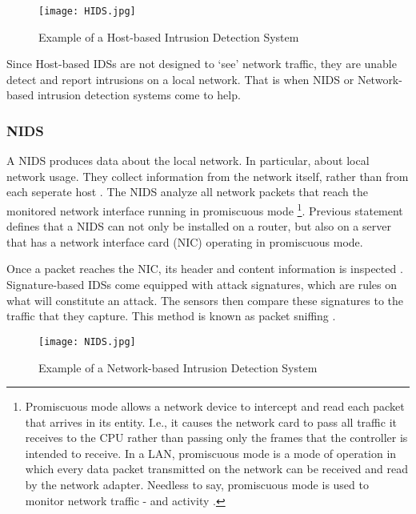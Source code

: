 \begin{figure}[h]
    \centering
    \texttt{[image: HIDS.jpg]}
    \caption{Example of a Host-based Intrusion Detection System}
    \label{fig:HIDS}
\end{figure}

Since Host-based IDSs are not designed to `see' network traffic, they are unable detect and report intrusions on a local network. That is when NIDS or Network-based intrusion detection systems come to help.

\subsubsection{NIDS}

A NIDS \label{subsub:NIDS} produces data about the local network. In particular, about local network usage. They collect information from the network itself, rather than from each seperate host \citep{Host2}. The NIDS analyze all network packets that reach the monitored network interface running in promiscuous mode \footnote{Promiscuous mode allows a network device to intercept and read each packet that arrives in its entity. I.e., it causes the network card to pass all traffic it receives to the CPU rather than passing only the frames that the controller is intended to receive. In a LAN, promiscuous mode is a mode of operation in which every data packet transmitted on the network can be received and read by the network adapter. Needless to say, promiscuous mode is used to monitor network traffic - and activity \citep{Prom}.}. Previous statement defines that a NIDS can not only be installed on a router, but also on a server that has a network interface card (NIC) operating in promiscuous mode.

Once a packet reaches the NIC, its header and content information is inspected \citep{Host2}. Signature-based IDSs come equipped with attack signatures, which are rules on what will constitute an attack. The sensors then compare these signatures to the traffic  that they capture. This method is known as packet sniffing \citep{Sniffing}.

\begin{figure}[h]
    \centering
    \texttt{[image: NIDS.jpg]}
    \caption{Example of a Network-based Intrusion Detection System}
    \label{fig:NIDS}
\end{figure}

